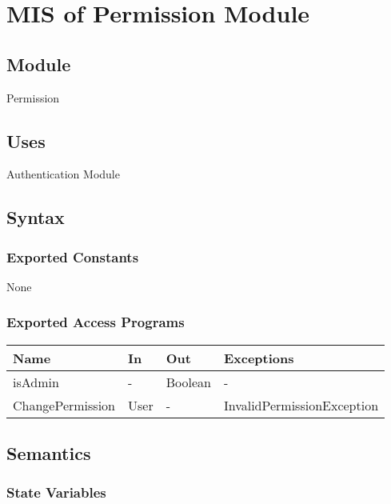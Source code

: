 \documentclass[12pt, titlepage]{article}
\begin{document}
\section{MIS of Permission Module} \label{mPerm}

\subsection{Module}

Permission

\subsection{Uses}

Authentication Module

\subsection{Syntax}

\subsubsection{Exported Constants}

None

\subsubsection{Exported Access Programs}

\begin{center}
	\begin{tabular}{p{4cm} p{2cm} p{4cm} p{4cm}}
	\hline
	\textbf{Name} & \textbf{In} & \textbf{Out} & \textbf{Exceptions} \\
	\hline
	isAdmin & - & Boolean & - \\
	ChangePermission & User & - & InvalidPermissionException \\
	\hline
	\end{tabular}
\end{center}

\subsection{Semantics}

\subsubsection{State Variables}
\end{document}
